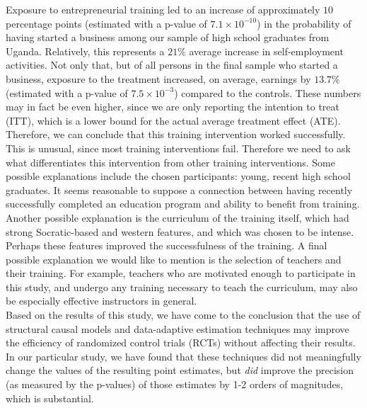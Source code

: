 Exposure to entrepreneurial training led to an increase of approximately $10$ percentage points (estimated with a p-value of $7.1 \times 10^{-10}$) in the probability of having started a business among our sample of high school graduates from Uganda. Relatively, this represents a $21\%$ average increase in self-employment activities. Not only that, but of all persons in the final sample who started a business, exposure to the treatment increased, on average, earnings by $13.7\%$ (estimated with a p-value of $7.5 \times 10^{-3}$) compared to the controls. These numbers may in fact be even higher, since we are only reporting the intention to treat (ITT), which is a lower bound for the actual average treatment effect (ATE).\\

Therefore, we can conclude that this training intervention worked successfully. This is unusual, since most training interventions fail. Therefore we need to ask what differentiates this intervention from other training interventions. Some possible explanations include the chosen participants: young, recent high school graduates. It seems reasonable to suppose a connection between having recently successfully completed an education program and ability to benefit from training. Another possible explanation is the curriculum of the training itself, which had strong Socratic-based and western features, and which was chosen to be intense. Perhaps these features improved the successfulness of the training. A final possible explanation we would like to mention is the selection of teachers and their training. For example, teachers who are motivated enough to participate in this study, and undergo any training necessary to teach the curriculum, may also be especially effective instructors in general.\\

Based on the results of this study, we have come to the conclusion that the use of structural causal models and data-adaptive estimation techniques may improve the efficiency of randomized control trials (RCTs) without affecting their results. In our particular study, we have found that these techniques did not meaningfully change the values of the resulting point estimates, but \textit{did} improve the precision (as measured by the p-values) of those estimates by 1-2 orders of magnitudes, which is substantial.



